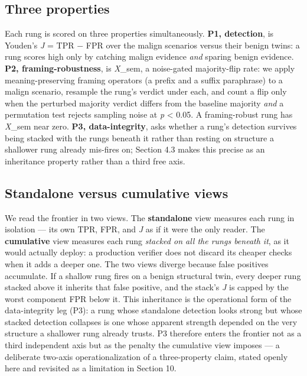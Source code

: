 \documentclass[sigconf,anonymous,review]{acmart}
\begin{document}
\subsection{Three properties}
Each rung is scored on three properties simultaneously. \textbf{P1, detection}, is Youden's \textit{J} = TPR $-$ FPR over the malign scenarios versus their benign twins: a rung scores high only by catching malign evidence \textit{and} sparing benign evidence. \textbf{P2, framing-robustness}, is \textit{X}\_sem, a noise-gated majority-flip rate: we apply meaning-preserving framing operators (a prefix and a suffix paraphrase) to a malign scenario, resample the rung's verdict under each, and count a flip only when the perturbed majority verdict differs from the baseline majority \textit{and} a permutation test rejects sampling noise at \textit{p} < 0.05. A framing-robust rung has \textit{X}\_sem near zero. \textbf{P3, data-integrity}, asks whether a rung's detection survives being stacked with the rungs beneath it rather than resting on structure a shallower rung already mis-fires on; Section 4.3 makes this precise as an inheritance property rather than a third free axis.


\subsection{Standalone versus cumulative views}
We read the frontier in two views. The \textbf{standalone} view measures each rung in isolation --- its own TPR, FPR, and \textit{J} as if it were the only reader. The \textbf{cumulative} view measures each rung \textit{stacked on all the rungs beneath it}, as it would actually deploy: a production verifier does not discard its cheaper checks when it adds a deeper one. The two views diverge because false positives accumulate. If a shallow rung fires on a benign structural twin, every deeper rung stacked above it inherits that false positive, and the stack's \textit{J} is capped by the worst component FPR below it. This inheritance is the operational form of the data-integrity leg (P3): a rung whose standalone detection looks strong but whose stacked detection collapses is one whose apparent strength depended on the very structure a shallower rung already trusts. P3 therefore enters the frontier not as a third independent axis but as the penalty the cumulative view imposes --- a deliberate two-axis operationalization of a three-property claim, stated openly here and revisited as a limitation in Section 10.
\end{document}
